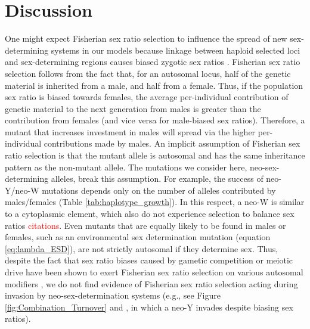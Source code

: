 \documentclass[12pt]{article}
\begin{document}
\section*{Discussion}

One might expect Fisherian sex ratio selection to influence the spread of new sex-determining systems in our models because linkage between haploid selected loci and sex-determining regions causes biased zygotic sex ratios \citep{Hamilton:1967ts,Burt:2006,Field:2012fd,Field:2013cc}. 
Fisherian sex ratio selection follows from the fact that, for an autosomal locus, half of the genetic material is inherited from a male, and half from a female. 
Thus, if the population sex ratio is biased towards females, the average per-individual contribution of genetic material to the next generation from males is greater than the contribution from females (and vice versa for male-biased sex ratios). 
Therefore, a mutant that increases investment in males will spread via the higher per-individual contributions made by males. 
An implicit assumption of Fisherian sex ratio selection is that the mutant allele is autosomal and has the same inheritance pattern as the non-mutant allele. 
The mutations we consider here, neo-sex-determining alleles, break this assumption. 
For example, the success of neo-Y/neo-W mutations depends only on the number of alleles contributed by males/females (Table \ref{tab:haplotype_growth}). 
In this respect, a neo-W is similar to a cytoplasmic element, which also do not experience selection to balance sex ratios \textcolor{red}{citations}.
Even mutants that are equally likely to be found in males or females, such as an environmental sex determination mutation (equation \ref{eq:lambda_ESD}), are not strictly autosomal if they determine sex. 
Thus, despite the fact that sex ratio biases caused by gametic competition or meiotic drive have been shown to exert Fisherian sex ratio selection on various autosomal modifiers \citep{Stalker:1961th,Smith:1975ft,Frank:1989vl,Hough:2013uo,Ubeda:2015fx, Otto:2015va}, we do not find evidence of Fisherian sex ratio selection acting during invasion by neo-sex-determination systems (e.g., see Figure \ref{fig:Combination_Turnover} and \citealt{Ubeda:2015fx}, in which a neo-Y invades despite biasing sex ratios). 
\end{document}
